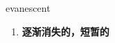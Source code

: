 
\begin{frame}
{\huge evanescent}
\begin{center}
\begin{enumerate}\Large
  \item \textbf{逐渐消失的，短暂的}
\end{enumerate}
\end{center}
\end{frame}
